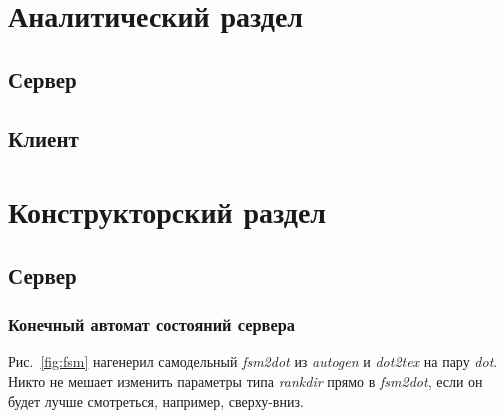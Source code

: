 \documentclass[a4paper,12pt]{report}
\begin{document}


\chapter{Аналитический раздел}

\section{Сервер}

\section{Клиент}

\chapter{Конструкторский раздел}

\section{Сервер}

\subsection{Конечный автомат состояний сервера}

Рис.~\ref{fig:fsm} нагенерил самодельный \textit{fsm2dot} из \textit{autogen} и \textit{dot2tex} на пару \textit{dot}. Никто не мешает изменить параметры типа \textit{rankdir} прямо в \textit{fsm2dot}, если он будет лучше смотреться, например, сверху-вниз.
\end{document}
